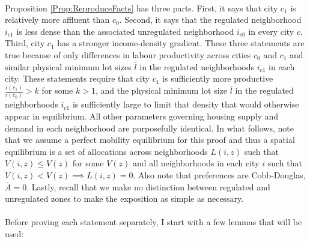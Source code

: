\documentclass[11pt]{article}
\begin{document}
	\paragraph*{}
	Proposition \ref{Prop:ReproduceFacts} has three parts. First, it says that city $c_{1}$ is relatively more affluent than $c_{0}$. Second, it says that the regulated neighborhood $i_{c1}$ is less dense than the associated unregulated neighborhood $i_{c0}$ in every city $c$. Third, city $c_{1}$ has a stronger income-density gradient. These three statements are true because of only differences in labour productivity across cities $c_{0}$ and $c_{1}$ and similar physical minimum lot sizes $\bar{l}$ in the regulated neighborhoods $i_{c1}$ in each city. These statements require that city $c_{1}$ is sufficiently more productive $\frac{\iota(c_{1})}{\iota(c_{0})} > k$ for some $k > 1$, and the physical minimum lot size $\bar{l}$ in the regulated neighborhoods $i_{c1}$ is sufficiently large to limit that density that would otherwise appear in equilibrium. All other parameters governing housing supply and demand in each neighborhood are purposefully identical. In what follows, note that we assume a perfect mobility equilibrium for this proof and thus a spatial equilibrium is a set of allocations across neighborhoods $L(i, z)$ such that $V(i, z) \leq V(z)$ for some $V(z)$ and all neighborhoods in each city $i$ such that $V(i, z) < V(z) \implies L(i, z) = 0$. Also note that preferences are Cobb-Douglas, $\bar{A} = 0$. Lastly, recall that we make no distinction between regulated and unregulated zones to make the exposition as simple as necessary. 
	
	\paragraph*{}Before proving each statement separately, I start with a few lemmas that will be used:
	
\end{document}

